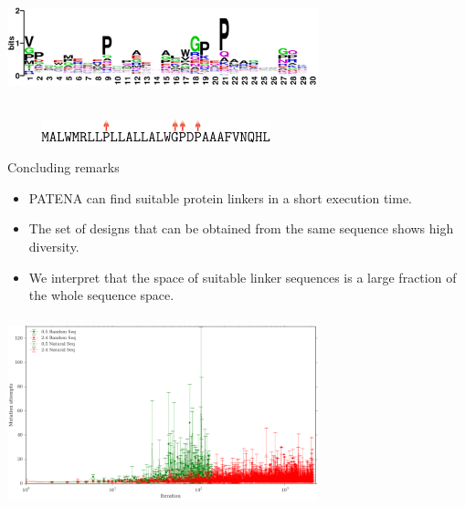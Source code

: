 \documentclass{beamer}
\begin{document}
\begin{frame}
\begin{adjustwidth}{-1.5em}{-2.5em}
\includegraphics[width=340px,height=150px]{../img/logo.png}\\ 
\hspace{18px}\includegraphics[width=325px,height=25px]{../img/sequence2.png}
\end{adjustwidth}
\end{frame}


\begin{frame}{Concluding remarks}
\begin{itemize}
 \item PATENA can find suitable protein linkers in a short execution time.
 \item The set of designs that can be obtained from the same sequence shows high diversity. 
 \item We interpret that the space of suitable linker sequences is a large fraction of the whole sequence space.
\end{itemize}
\end{frame}







\begin{frame}
\begin{adjustwidth}{-1.5em}{-2.5em}
\includegraphics[width=340px,height=210px]{../img/mutAttemptsVsMutation.png} 
\end{adjustwidth}
\end{frame}
\end{document}
